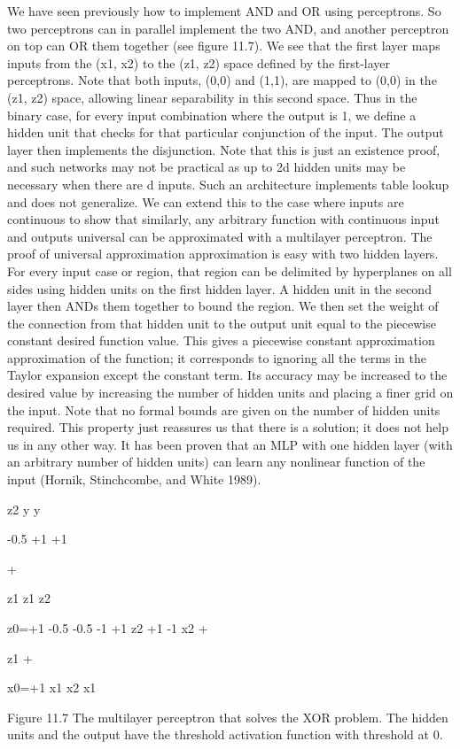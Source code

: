 We have seen previously how to implement AND and OR using perceptrons. So two perceptrons can in parallel implement the two AND, and another perceptron on top can OR them together (see figure 11.7). We see that the first layer maps inputs from the (x1, x2) to the (z1, z2) space defined by the first-layer perceptrons. Note that both inputs, (0,0) and (1,1), are mapped to (0,0) in the (z1, z2) space, allowing linear separability in this second space. Thus in the binary case, for every input combination where the output is 1, we define a hidden unit that checks for that particular conjunction of the input. The output layer then implements the disjunction. Note that this is just an existence proof, and such networks may not be practical as up to 2d hidden units may be necessary when there are d inputs. Such an architecture implements table lookup and does not generalize. We can extend this to the case where inputs are continuous to show that similarly, any arbitrary function with continuous input and outputs universal can be approximated with a multilayer perceptron. The proof of universal approximation approximation is easy with two hidden layers. For every input case or region, that region can be delimited by hyperplanes on all sides using hidden units on the first hidden layer. A hidden unit in the second layer then ANDs them together to bound the region. We then set the weight of the connection from that hidden unit to the output unit equal to the piecewise constant desired function value. This gives a piecewise constant approximation approximation of the function; it corresponds to ignoring all the terms in the Taylor expansion except the constant term. Its accuracy may be increased to the desired value by increasing the number of hidden units and placing a finer grid on the input. Note that no formal bounds are given on the number of hidden units required. This property just reassures us that there is a solution; it does not help us in any other way. It has been proven that an MLP with one hidden layer (with an arbitrary number of hidden units) can learn any nonlinear function of the input (Hornik, Stinchcombe, and White 1989).

z2 y y

-0.5 +1 +1

+

z1 z1 z2

z0=+1 -0.5 -0.5 -1 +1 z2 +1 -1 x2 +

z1 +

x0=+1 x1 x2 x1

Figure 11.7 The multilayer perceptron that solves the XOR problem. The hidden units and the output have the threshold activation function with threshold at 0.

